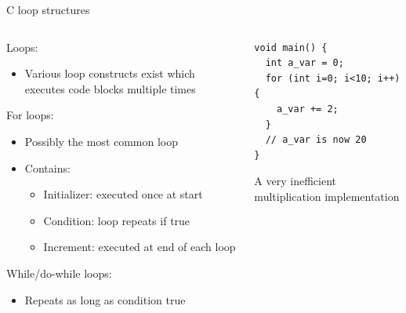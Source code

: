 \documentclass{beamer}
\begin{document}
\begin{frame}[fragile]{C loop structures}
  \begin{columns}[T]
    \begin{column}{.6\textwidth}
      Loops:
      \begin{itemize}
        \item Various loop constructs exist which executes code blocks multiple times
      \end{itemize}  
      For loops:
      \begin{itemize}
        \item Possibly the most common loop
        \item Contains:
        \begin{itemize}
          \item Initializer: executed once at start
          \item Condition: loop repeats if true
          \item Increment: executed at end of each loop
        \end{itemize}
      \end{itemize}
      While/do-while loops:      
      \begin{itemize}
        \item Repeats as long as condition true
      \end{itemize}
    \end{column}

    \begin{column}{0.4\textwidth}
\begin{lstlisting}[tabsize=2,basicstyle=\ttfamily\scriptsize]
void main() {
  int a_var = 0;
  for (int i=0; i<10; i++) {
    a_var += 2;
  }
  // a_var is now 20
} \end{lstlisting} 
A very inefficient multiplication implementation
    \end{column}
  \end{columns}
\end{frame}

\end{document}
